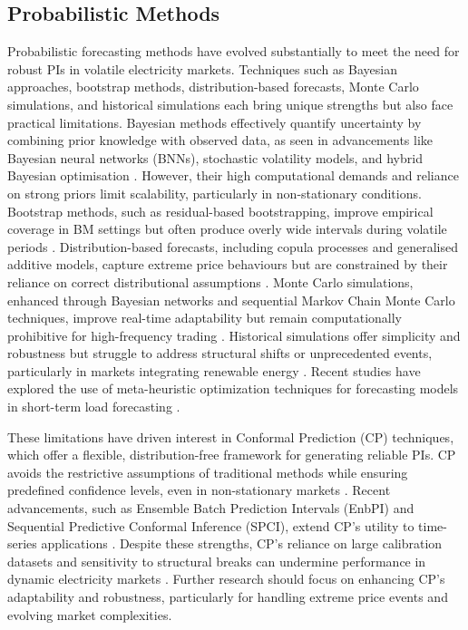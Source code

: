 \subsection{Probabilistic Methods}
Probabilistic forecasting methods have evolved substantially to meet the need for robust PIs in volatile electricity markets. Techniques such as Bayesian approaches, bootstrap methods, distribution-based forecasts, Monte Carlo simulations, and historical simulations each bring unique strengths but also face practical limitations. Bayesian methods effectively quantify uncertainty by combining prior knowledge with observed data, as seen in advancements like Bayesian neural networks (BNNs), stochastic volatility models, and hybrid Bayesian optimisation \cite{vahidinasab2010bayesian, kostrzewski2019probabilistic, cheng2019hybrid}. However, their high computational demands and reliance on strong priors limit scalability, particularly in non-stationary conditions. Bootstrap methods, such as residual-based bootstrapping, improve empirical coverage in BM settings but often produce overly wide intervals during volatile periods \cite{uniejewski2019importance, khosravi2013quantifying}. Distribution-based forecasts, including copula processes and generalised additive models, capture extreme price behaviours but are constrained by their reliance on correct distributional assumptions \cite{klein2023deep, serinaldi2011distributional, monteiro2018new}. Monte Carlo simulations, enhanced through Bayesian networks and sequential Markov Chain Monte Carlo techniques, improve real-time adaptability but remain computationally prohibitive for high-frequency trading \cite{yuanchen2023electricity}. Historical simulations offer simplicity and robustness but struggle to address structural shifts or unprecedented events, particularly in markets integrating renewable energy \cite{maciejowska2024multiple, janczura2024expectile}. Recent studies have explored the use of meta-heuristic optimization techniques for forecasting models in short-term load forecasting \cite{bhatnagar2025using}.

These limitations have driven interest in Conformal Prediction (CP) techniques, which offer a flexible, distribution-free framework for generating reliable PIs. CP avoids the restrictive assumptions of traditional methods while ensuring predefined confidence levels, even in non-stationary markets \cite{gammerman1998learning, vovk2005algorithmic}. Recent advancements, such as Ensemble Batch Prediction Intervals (EnbPI) and Sequential Predictive Conformal Inference (SPCI), extend CP’s utility to time-series applications \cite{xu2023sequential}. Despite these strengths, CP’s reliance on large calibration datasets and sensitivity to structural breaks can undermine performance in dynamic electricity markets \cite{foygel2022conformal}. Further research should focus on enhancing CP’s adaptability and robustness, particularly for handling extreme price events and evolving market complexities.




